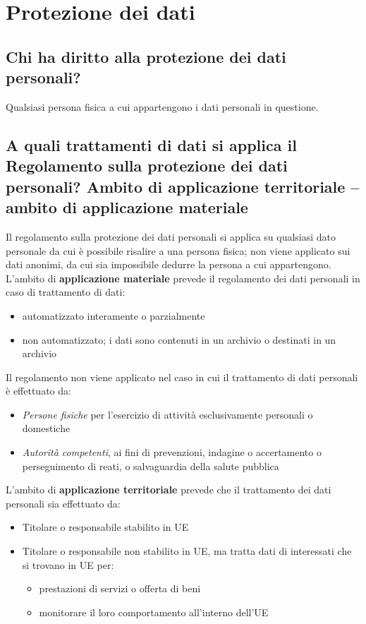 \newpage
\section{Protezione dei dati}

\subsection{Chi ha diritto alla protezione dei dati personali?}
Qualsiasi persona fisica a cui appartengono i dati personali in questione.

\subsection{A quali trattamenti di dati si applica il Regolamento sulla protezione dei dati personali?
Ambito di applicazione territoriale – ambito di applicazione materiale}

Il regolamento sulla protezione dei dati personali si applica su qualsiasi dato
personale da cui è possibile risalire a una persona fisica; non viene applicato
sui dati anonimi, da cui sia impossibile dedurre la persona a cui appartengono.
\newline
L'ambito di \textbf{applicazione materiale} prevede il regolamento dei dati
personali in caso di trattamento di dati:
\begin{itemize}
    \item automatizzato interamente o parzialmente
    \item non automatizzato; i dati sono contenuti in un archivio o destinati in un archivio
\end{itemize}
Il regolamento non viene applicato nel caso in cui il trattamento di dati personali è effettuato da:
\begin{itemize}
    \item \textit{Persone fisiche} per l'esercizio di attività esclusivamente personali o domestiche
    \item \textit{Autorità competenti}, ai fini di prevenzioni, indagine o
        accertamento o perseguimento di reati, o salvaguardia della salute
        pubblica
\end{itemize}
L'ambito di \textbf{applicazione territoriale} prevede che il trattamento dei
dati personali sia effettuato da:
\begin{itemize}
    \item Titolare o responsabile stabilito in UE
    \item Titolare o responsabile non stabilito in UE, ma tratta dati di
        interessati che si trovano in UE per:
        \begin{itemize}
            \item  prestazioni di servizi o offerta di beni
            \item monitorare il loro comportamento all'interno dell'UE
        \end{itemize}
\end{itemize}

